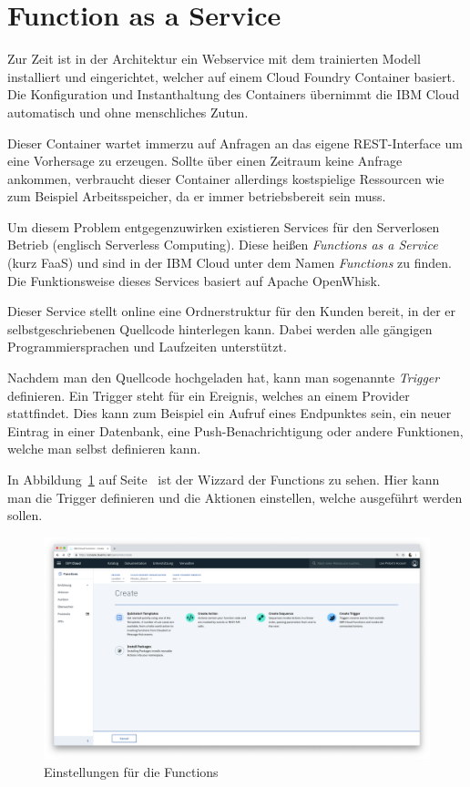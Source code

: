 \section{Function as a Service}
Zur Zeit ist in der Architektur ein Webservice mit dem trainierten Modell installiert und eingerichtet, welcher auf
einem Cloud Foundry Container basiert. Die Konfiguration und Instanthaltung des Containers übernimmt die IBM Cloud
automatisch und ohne menschliches Zutun.

Dieser Container wartet immerzu auf Anfragen an das eigene REST-Interface um eine Vorhersage zu erzeugen. Sollte über
einen Zeitraum keine Anfrage ankommen, verbraucht dieser Container allerdings kostspielige Ressourcen wie zum Beispiel
Arbeitsspeicher, da er immer betriebsbereit sein muss.

Um diesem Problem entgegenzuwirken existieren Services für den Serverlosen Betrieb (englisch Serverless Computing).
Diese heißen \textit{Functions as a Service} (kurz FaaS) und sind in der IBM Cloud unter dem Namen \textit{Functions}
zu finden. Die Funktionsweise dieses Services basiert auf Apache OpenWhisk.

Dieser Service stellt online eine Ordnerstruktur für den Kunden bereit, in der er selbstgeschriebenen Quellcode
hinterlegen kann. Dabei werden alle gängigen Programmiersprachen und Laufzeiten unterstützt.

Nachdem man den Quellcode hochgeladen hat, kann man sogenannte \textit{Trigger} definieren. Ein Trigger steht für ein
Ereignis, welches an einem Provider stattfindet. Dies kann zum Beispiel ein Aufruf eines Endpunktes sein, ein neuer
Eintrag in einer Datenbank, eine Push-Benachrichtigung oder andere Funktionen, welche man selbst definieren kann.

In Abbildung~\ref{fig:ausblick_functions} auf Seite~\pageref{fig:ausblick_functions} ist der Wizzard der Functions zu
sehen. Hier kann man die Trigger definieren und die Aktionen einstellen, welche ausgeführt werden sollen.

\begin{figure}[h]
    \centering
    \includegraphics[width=\textwidth]{images/kapitel_6/functions_wizzard.png}
    \caption{Einstellungen für die Functions}
    \label{fig:ausblick_functions}
\end{figure}

